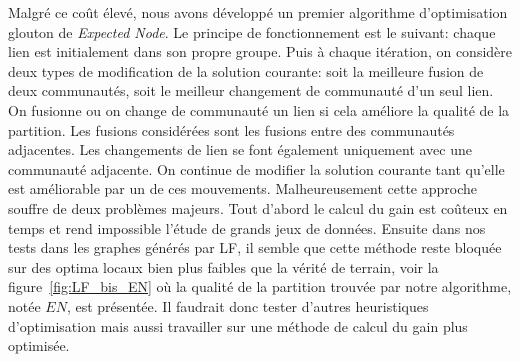 Malgré ce coût élevé, nous avons développé un premier algorithme d'optimisation glouton de \emph{Expected Node}.
Le principe de fonctionnement est le suivant: chaque lien est initialement dans son propre groupe.
Puis à chaque itération, on considère deux types de modification de la solution courante: soit la meilleure fusion de deux communautés, soit le meilleur changement de communauté d'un seul lien.
On fusionne ou on change de communauté un lien si cela améliore la qualité de la partition.
Les fusions considérées sont les fusions entre des communautés adjacentes.
Les changements de lien se font également uniquement avec une communauté adjacente.
On continue de modifier la solution courante tant qu'elle est améliorable par un de ces mouvements.
Malheureusement cette approche souffre de deux problèmes majeurs.
Tout d'abord le calcul du gain est coûteux en temps et rend impossible l'étude de grands jeux de données.
Ensuite dans nos tests dans les graphes générés par LF, il semble que cette méthode reste bloquée sur des optima locaux bien plus faibles que la vérité de terrain, voir la figure~\ref{fig:LF_bis_EN} où la qualité de la partition trouvée par notre algorithme, notée $EN$, est présentée.
Il faudrait donc tester d'autres heuristiques d'optimisation mais aussi travailler sur une méthode de calcul du gain plus optimisée.

